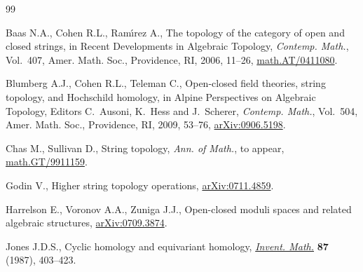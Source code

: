 \documentclass[10pt,a4paper]{amsart}
\begin{document}
\begin{thebibliography}{99}

\footnotesize\itemsep=0pt

Baas N.A., Cohen  R.L., Ram\'{\i}rez A.,
The topology of the category of open and closed strings,
in Recent Developments in Algebraic Topology,
{\it Contemp. Math.}, Vol.~407, Amer. Math. Soc., Providence, RI, 2006,  11--26,
\href{http://arxiv.org/abs/math.AT/0411080}{math.AT/0411080}.

Blumberg A.J., Cohen R.L., Teleman C.,
Open-closed f\/ield theories, string topology, and Hochschild homo\-lo\-gy,
in Alpine Perspectives on Algebraic Topology, Editors C.~Ausoni, K.~Hess and J.~Scherer,
{\it Contemp. Math.}, Vol.~504, Amer. Math. Soc., Providence, RI, 2009, 53--76,
\href{http://arxiv.org/abs/0906.5198}{arXiv:0906.5198}.


 Chas M., Sullivan D.,
String topology,
{\it Ann. of Math.}, to appear,
\href{http://arxiv.org/abs/math.GT/9911159}{math.GT/9911159}.

Godin V.,
Higher string topology operations,
\href{http://arxiv.org/abs/0711.4859}{arXiv:0711.4859}.

Harrelson E., Voronov A.A., Zuniga J.J.,
Open-closed moduli spaces and related algebraic structures,
\href{http://arxiv.org/abs/0709.3874}{arXiv:0709.3874}.

Jones J.D.S.,
Cyclic homology and equivariant homology,
\href{http://dx.doi.org/10.1007/BF01389424}{{\it Invent. Math.}} {\bf 87} (1987), 403--423.





\end{thebibliography}
\end{document}
